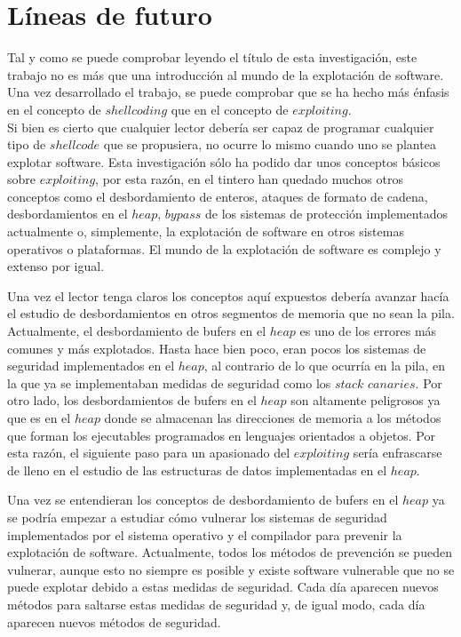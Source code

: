 \documentclass [titlepage, 12pt]{article}
\begin{document}
\section{L\'ineas de futuro}
\bigskip
Tal y como se puede comprobar leyendo el t\'itulo de esta investigaci\'on, este trabajo no es m\'as que una introducci\'on al mundo de la explotaci\'on de software. Una vez desarrollado el trabajo, se puede comprobar que se ha hecho m\'as \'enfasis en el concepto de $shellcoding$ que en el concepto de $exploiting$. \\
Si bien es cierto que cualquier lector deber\'ia ser capaz de programar cualquier tipo de $shellcode$ que se propusiera, no ocurre lo mismo cuando uno se plantea explotar software. Esta investigaci\'on s\'olo ha podido dar unos conceptos b\'asicos sobre $exploiting$, por esta raz\'on, en el tintero han quedado muchos otros conceptos como el desbordamiento de enteros, ataques de formato de cadena, desbordamientos en el $heap$, $bypass$ de los sistemas de protecci\'on implementados actualmente o, simplemente, la explotaci\'on de software en otros sistemas operativos o plataformas. El mundo de la explotaci\'on de software es complejo y extenso por igual. \bigskip

Una vez el lector tenga claros los conceptos aqu\'i expuestos deber\'ia avanzar hac\'ia el estudio de desbordamientos en otros segmentos de memoria que no sean la pila. Actualmente, el desbordamiento de bufers en el $heap$ es uno de los errores m\'as comunes y m\'as explotados. Hasta hace bien poco, eran pocos los sistemas de seguridad implementados en el $heap$, al contrario de lo que ocurr\'ia en la pila, en la que ya se implementaban medidas de seguridad como los $stack$ $canaries$. Por otro lado, los desbordamientos de bufers en el $heap$ son altamente peligrosos ya que es en el $heap$ donde se almacenan las direcciones de memoria a los m\'etodos que forman los ejecutables programados en lenguajes orientados a objetos. Por esta raz\'on, el siguiente paso para un apasionado del $exploiting$ ser\'ia enfrascarse de lleno en el estudio de las estructuras de datos implementadas en el $heap$. \bigskip

Una vez se entendieran los conceptos de desbordamiento de bufers en el $heap$ ya se podr\'ia empezar a estudiar c\'omo vulnerar los sistemas de seguridad implementados por el sistema operativo y el compilador para prevenir la explotaci\'on de software. Actualmente, todos los m\'etodos de prevenci\'on se pueden vulnerar, aunque esto no siempre es posible y existe software vulnerable que no se puede explotar debido a estas medidas de seguridad. Cada d\'ia aparecen nuevos m\'etodos para saltarse estas medidas de seguridad y, de igual modo, cada d\'ia aparecen nuevos m\'etodos de seguridad.\bigskip
\end{document}
